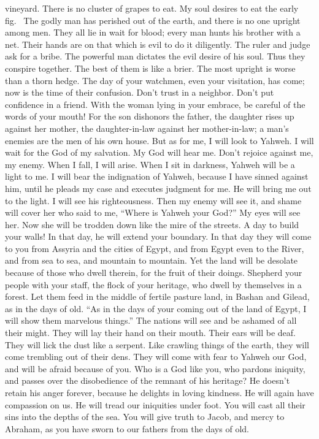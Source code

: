 vineyard. There is no cluster of grapes to eat. My soul desires to eat
the early fig.~ The godly man has perished out of the earth,
and there is no one upright among men. They all lie in wait for blood;
every man hunts his brother with a net.  Their hands are on
that which is evil to do it diligently. The ruler and judge ask for a
bribe. The powerful man dictates the evil desire of his soul. Thus they
conspire together.  The best of them is like a brier. The
most upright is worse than a thorn hedge. The day of your watchmen, even
your visitation, has come; now is the time of their confusion.
 Don't trust in a neighbor. Don't put confidence in a
friend. With the woman lying in your embrace, be careful of the words of
your mouth!  For the son dishonors the father, the daughter
rises up against her mother, the daughter-in-law against her
mother-in-law; a man's enemies are the men of his own house.
 But as for me, I will look to Yahweh. I will wait for the
God of my salvation. My God will hear me.  Don't rejoice
against me, my enemy. When I fall, I will arise. When I sit in darkness,
Yahweh will be a light to me.  I will bear the indignation
of Yahweh, because I have sinned against him, until he pleads my case
and executes judgment for me. He will bring me out to the light. I will
see his righteousness.  Then my enemy will see it, and
shame will cover her who said to me, ``Where is Yahweh your God?'' My
eyes will see her. Now she will be trodden down like the mire of the
streets.  A day to build your walls! In that day, he will
extend your boundary.  In that day they will come to you
from Assyria and the cities of Egypt, and from Egypt even to the River,
and from sea to sea, and mountain to mountain.  Yet the
land will be desolate because of those who dwell therein, for the fruit
of their doings.  Shepherd your people with your staff, the
flock of your heritage, who dwell by themselves in a forest. Let them
feed in the middle of fertile pasture land, in Bashan and Gilead, as in
the days of old.  ``As in the days of your coming out of
the land of Egypt, I will show them marvelous things.'' 
The nations will see and be ashamed of all their might. They will lay
their hand on their mouth. Their ears will be deaf.  They
will lick the dust like a serpent. Like crawling things of the earth,
they will come trembling out of their dens. They will come with fear to
Yahweh our God, and will be afraid because of you.  Who is
a God like you, who pardons iniquity, and passes over the disobedience
of the remnant of his heritage? He doesn't retain his anger forever,
because he delights in loving kindness.  He will again have
compassion on us. He will tread our iniquities under foot. You will cast
all their sins into the depths of the sea.  You will give
truth to Jacob, and mercy to Abraham, as you have sworn to our fathers
from the days of old.
